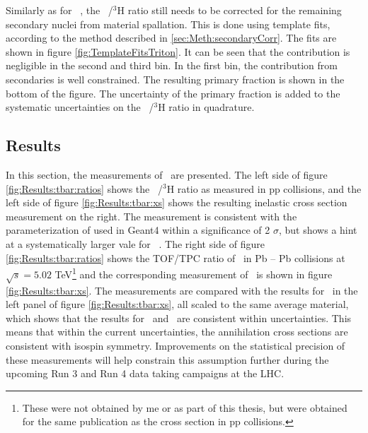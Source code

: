 Similarly as for \ahe\ , the \atrit\ /$^3\mathrm{H}$ ratio still needs to be corrected for the remaining secondary nuclei from material spallation. This is done using template fits, according to the method described in \ref{sec:Meth:secondaryCorr}. The fits are shown in figure \ref{fig:TemplateFitsTriton}. It can be seen that the contribution is negligible in the second and third bin. In the first bin, the contribution from secondaries is well constrained. The resulting primary fraction is shown in the bottom of the figure. The uncertainty of the primary fraction is added to the systematic uncertainties on the \atrit\ /$^3\mathrm{H}$ ratio in quadrature.


\subsection{Results}
In this section, the measurements of \sigmainelH\ are presented. The left side of figure \ref{fig:Results:tbar:ratios} shows the \atrit\ /$^3\mathrm{H}$ ratio as measured in pp collisions, and the left side of figure \ref{fig:Results:tbar:xs} shows the resulting inelastic cross section measurement on the right. The measurement is consistent with the parameterization of used in Geant4 within a significance of 2 $\sigma$, but shows a hint at a systematically larger vale for \sigmainelH\ . The right side of figure \ref{fig:Results:tbar:ratios} shows the TOF/TPC ratio of \atrit\ in Pb -- Pb collisions at $\sqrt{s}=5.02$ TeV\footnote{These were not obtained by me or as part of this thesis, but were obtained for the same publication as the cross section in pp collisions.} and the corresponding measurement of \sigmainelH\ is shown in figure \ref{fig:Results:tbar:xs}. The measurements are compared with the results for \ahe\ in the left panel of figure \ref{fig:Results:tbar:xs}, all scaled to the same average material, which shows that the results for \atrit\ and \ahe\ are consistent within uncertainties. This means that within the current uncertainties, the annihilation cross sections are consistent with isospin symmetry. Improvements on the statistical precision of these measurements will help constrain this assumption further during the upcoming Run 3 and Run 4 data taking campaigns at the LHC. 

